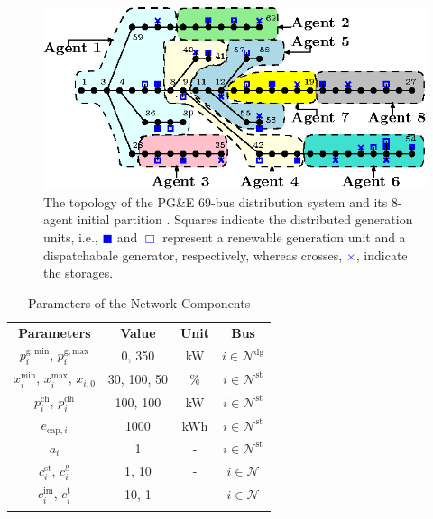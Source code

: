 \begin{figure}
	\centering
	\includegraphics[scale=0.9]{img/top_sim1.eps}
	\caption{The topology of the PG\&E 69-bus distribution system and its 8-agent initial partition \cite{arefifar2012}. Squares indicate the distributed generation units, i.e., \textcolor{blue}{$\blacksquare$} and \textcolor{blue}{$\Box$} represent a renewable generation unit and a dispatchabale generator, respectively, whereas crosses, \textcolor{blue}{$\boldsymbol{\times}$}, indicate the storages.
	}
	\label{fig:cs_top}
\end{figure}
\iffalse 
\begin{table}
	\centering
	\caption{Parameters of the Network Components}
	\label{tab:param}
	\begin{tabular}{c c c c}
		\hline  \noalign{\smallskip}
		\textbf{Parameters} & \textbf{Value} & \textbf{Unit} & \textbf{Bus} \\ 
		\noalign{\smallskip}\hline  \noalign{\smallskip}
		$p^{\mathrm{g,min}}_i$, $p^{\mathrm{g,max}}_i$  & 0, 350 & kW  & $i \in \mathcal{N}^{\mathrm{dg}}$ \\ 		   
		\noalign{\smallskip}
		$x^{\mathrm{min}}_i$, $x^{\mathrm{max}}_i$, $x_{i,0}$ & 30, 100, 50  & \% & $i \in \mathcal{N}^{\mathrm{st}}$\\ 
		\noalign{\smallskip}
		$p^{\mathrm{ch}}_i$, $p^{\mathrm{dh}}_i$ & 100, 100 & kW & $i \in \mathcal{N}^{\mathrm{st}}$  \\ 
		\noalign{\smallskip}
		$e_{\mathrm{cap},i}$ & 1000 & kWh & $i \in \mathcal{N}^{\mathrm{st}}$   \\
		\noalign{\smallskip}
		$a_i$  & 1  & -   & $i \in \mathcal{N}^{\mathrm{st}}$\\
		\noalign{\smallskip}
		$c^{\mathrm{st}}_i$, $c^{\mathrm{g}}_i$  & 1, 10 & -  & $i \in \mathcal{N}$ \\
		\noalign{\smallskip}
		$c^{\mathrm{im}}_i$, $c^{\mathrm{t}}_i$ & 10, 1 & - & $i \in \mathcal{N}$ \\		
		\noalign{\smallskip}
		\hline
	\end{tabular}
\end{table}

